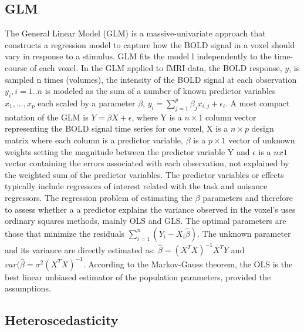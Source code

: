 \documentclass[10pt,letterpaper]{article}
\begin{document}
\subsection*{GLM}
The General Linear Model (GLM) is a massive-univariate approach that constructs a regression model to capture how the BOLD signal in a voxel should vary in response to a stimulus. GLM fits the model l independently to the time-course of each voxel.
In the GLM applied to fMRI data, the BOLD response, $y$, is sampled n times (volumes), the intensity of the BOLD signal at each observation $y_i, i =1..n$ is modeled as the sum of a number of known predictor variables $x_1,...,x_p$ each scaled by a parameter $\beta$, $y_i = \sum_{j=1}^{p} \beta_j x_{i,j} + \epsilon_i$. 
A most compact notation of the GLM is $Y = \beta X + \epsilon$, where Y is a $n \times 1$ column vector representing the BOLD signal time series for one voxel, X is a $n \times p$ design matrix where each column is a predictor variable, $\beta$ is a $p \times 1$ vector of unknown weights setting the magnitude between the predictor variable Y and $\epsilon$ is a $n x 1$ vector containing the errors associated with each observation, not explained by the weighted sum of the predictor variables. 
The predictor variables or effects typically include regressors of interest related with the task and nuisance regressors. 
The regression problem of estimating the $\beta$ parameters and therefore to assess whether a a predictor explains the variance observed in the voxel's uses ordinary squares methods, mainly OLS and GLS. The optimal parameters are those that minimize the residuals $\sum_{i=1}^{n}(Y_i - X_i \hat{\beta})$. The unknown parameter and its variance are directly estimated as: $\hat{\beta} = (X^T X)^{-1}X^T Y$ and $var(\hat{\beta} = \sigma^2(X^T X)^{-1}$.
According to the Markov-Gauss theorem, the OLS is the best linear unbiased estimator of the population parameters, provided the assumptions. 
\subsection*{Heteroscedasticity}
\end{document}
